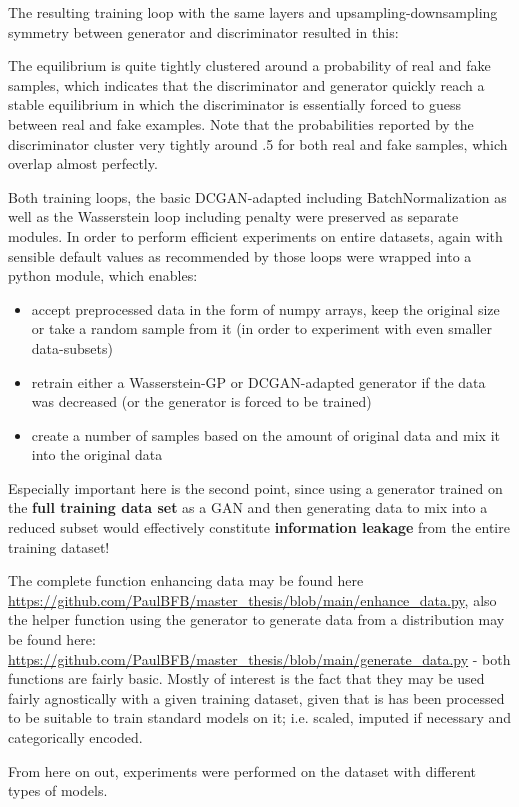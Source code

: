 The resulting training loop with the same layers and upsampling-downsampling symmetry between generator and discriminator resulted in this:


The equilibrium is quite tightly clustered around a probability of real and fake samples, which indicates that the discriminator and generator quickly reach a stable equilibrium 
in which the discriminator is essentially forced to guess between real and fake examples. Note that the probabilities reported by the discriminator cluster very tightly around .5 for both real and fake samples, which overlap almost perfectly.

\pagebreak

Both training loops, the basic DCGAN-adapted including BatchNormalization as well as the Wasserstein loop including penalty were preserved as separate modules. 
In order to perform efficient experiments on entire datasets, again with sensible default values as recommended by \cite{buitinck2013api} those loops were wrapped into a python module, which enables:

\begin{itemize}
	\item accept preprocessed data in the form of numpy arrays, keep the original size or take a random sample from it (in order to experiment with even smaller data-subsets)
	\item retrain either a Wasserstein-GP or DCGAN-adapted generator if the data was decreased (or the generator is forced to be trained)
	\item create a number of samples based on the amount of original data and mix it into the original data
\end{itemize}

Especially important here is the second point, since using a generator trained on the \textbf{full training data set} as a \ac{GAN} and then generating data to mix into a reduced subset 
would effectively constitute \textbf{information leakage} from the entire training dataset!

The complete function enhancing data may be found here \url{https://github.com/PaulBFB/master_thesis/blob/main/enhance_data.py}, also the helper function using the generator to generate data from a distribution may be found here: \url{https://github.com/PaulBFB/master_thesis/blob/main/generate_data.py} - both functions are fairly basic. 
Mostly of interest is the fact that they may be used fairly agnostically with a given training dataset, given that is has been processed to be suitable to train standard models on it; i.e. scaled, imputed if necessary and categorically encoded.

From here on out, experiments were performed on the dataset with different types of models.

